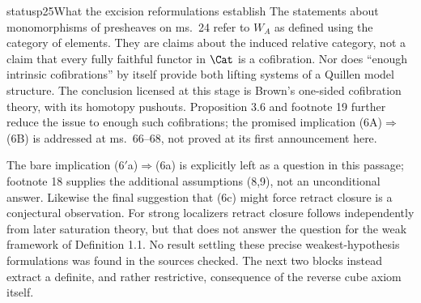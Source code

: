 \begin{dcomment}{status}{p25}{What the excision reformulations establish}
The statements about monomorphisms of presheaves on ms.~24 refer to $W_A$ as defined using the category of elements. They are claims about the induced relative category, not a claim that every fully faithful functor in $\Cat$ is a cofibration. Nor does ``enough intrinsic cofibrations'' by itself provide both lifting systems of a Quillen model structure. The conclusion licensed at this stage is Brown's one-sided cofibration theory, with its homotopy pushouts. Proposition 3.6 and footnote 19 further reduce the issue to enough such cofibrations; the promised implication (6A)$\Rightarrow$(6B) is addressed at ms.~66--68, not proved at its first announcement here.

The bare implication (6$'$a)$\Rightarrow$(6a) is explicitly left as a question in this passage; footnote 18 supplies the additional assumptions (8,9), not an unconditional answer. Likewise the final suggestion that (6c) might force retract closure is a conjectural observation. For strong localizers retract closure follows independently from later saturation theory, but that does not answer the question for the weak framework of Definition 1.1. No result settling these precise weakest-hypothesis formulations was found in the sources checked. The next two blocks instead extract a definite, and rather restrictive, consequence of the reverse cube axiom itself.
\end{dcomment}

